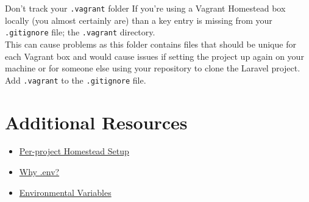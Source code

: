 \begin{infobox}{Don't track your \texttt{.vagrant} folder}
    If you're using a Vagrant Homestead box locally (you almost certainly are) than a key entry is missing from your \texttt{.gitignore} file; the \texttt{.vagrant} directory.
    \\
    
    This can cause problems as this folder contains files that should be unique for each Vagrant box and would cause issues if setting the project up again on your machine or for someone else using your repository to clone the Laravel project.
    \\

    Add \texttt{.vagrant} to the \texttt{.gitignore} file.
\end{infobox}

\section{Additional Resources}

\begin{itemize}[leftmargin=*]
    \item \href{http://laravel.com/docs/master/homestead#per-project-installation}{Per-project Homestead Setup}
    \item \href{https://github.com/vlucas/phpdotenv#why-env}{Why .env?}
    \item \href{https://en.wikipedia.org/wiki/Environment\_variable}{Environmental Variables}
\end{itemize}

